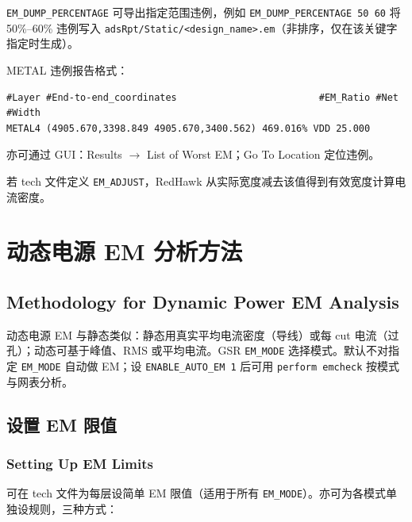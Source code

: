 \texttt{EM\_DUMP\_PERCENTAGE} 可导出指定范围违例，例如 \texttt{EM\_DUMP\_PERCENTAGE 50 60} 将 50\%--60\% 违例写入 \texttt{adsRpt/Static/<design\_name>.em}（非排序，仅在该关键字指定时生成）。

METAL 违例报告格式：
\begin{lstlisting}
#Layer #End-to-end_coordinates                         #EM_Ratio #Net #Width
METAL4 (4905.670,3398.849 4905.670,3400.562) 469.016% VDD 25.000
\end{lstlisting}

亦可通过 GUI：Results $\rightarrow$ List of Worst EM；Go To Location 定位违例。

若 tech 文件定义 \texttt{EM\_ADJUST}，RedHawk 从实际宽度减去该值得到有效宽度计算电流密度。

\section{动态电源 EM 分析方法}
\subsection*{Methodology for Dynamic Power EM Analysis}
\label{sec:dyn-em}

动态电源 EM 与静态类似：静态用真实平均电流密度（导线）或每 cut 电流（过孔）；动态可基于峰值、RMS 或平均电流。GSR \texttt{EM\_MODE} 选择模式。默认不对指定 \texttt{EM\_MODE} 自动做 EM；设 \texttt{ENABLE\_AUTO\_EM 1} 后可用 \texttt{perform emcheck} 按模式与网表分析。

\subsection{设置 EM 限值}
\subsubsection*{Setting Up EM Limits}

可在 tech 文件为每层设简单 EM 限值（适用于所有 \texttt{EM\_MODE}）。亦可为各模式单独设规则，三种方式：

